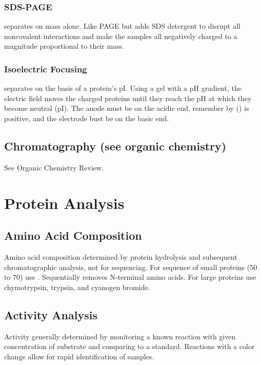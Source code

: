 \documentclass[../Bio_chemistryReview.tex]{subfiles}
\begin{document}
\subsubsection{SDS-PAGE\supdag}

 separates on mass alone. Like PAGE but adds
SDS detergent to disrupt all noncovalent interactions and make the samples all
negatively charged to a magnitude proportional to their mass.

\subsubsection{Isoelectric Focusing\supdag}	

 separates on the basis of a protein's pI. Using a
gel with a pH gradient, the electric field moves the charged proteins until they
reach the pH at which they become neutral (pI). The anode must be on the acidic
end, remember by () is positive, and the electrode bust be on the
basic end.

\subsection{Chromatography (see organic chemistry)\supdag}

See Organic Chemistry Review.

\section{Protein Analysis\supdag}

\subsection{Amino Acid Composition\supdag}

Amino acid composition determined by protein hydrolysis and subsequent
chromatographic analysis, not for sequencing. For sequence of small proteins (50
to 70) use . Sequentially removes N-terminal amino
acids. For large proteins use chymotrypsin, trypsin, and cyanogen bromide.

\subsection{Activity Analysis\supdag} 

Activity generally determined by monitoring a known reaction with given
concentration of substrate and comparing to a standard. Reactions with a color
change allow for rapid identification of samples.
\end{document}
